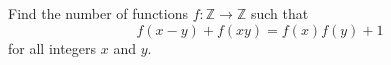 Find the number of functions $f:\mathbb Z\to\mathbb Z$ such that
\[f(x-y)+f(xy)=f(x)f(y)+1\]
for all integers $x$ and $y$.
